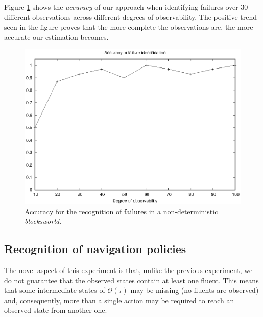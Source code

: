 \documentclass[letterpaper]{article} %
\begin{document}

Figure \ref{fig:blocks_acc} shows the {\em accuracy} of our approach when identifying failures over 30 different observations across different degrees of observability. The positive trend seen in the figure proves that the more complete the observations are, the more accurate our estimation becomes.






\begin{figure}
	\centering
	\includegraphics[width=0.9\linewidth]{figures/blocks.eps}
	\caption{Accuracy for the recognition of failures in a non-deterministic {\em blocksworld}.}
	\label{fig:blocks_acc}
\end{figure}



\subsection{Recognition of navigation policies}
The novel aspect of this experiment is that, unlike the previous experiment, we do not guarantee that the observed states contain at least one fluent. This means that some intermediate states of $\mathcal{O}(\tau)$ may be missing (no fluents are observed) and, consequently, more than a single action may be required to reach an observed state from another one.
\end{document}
